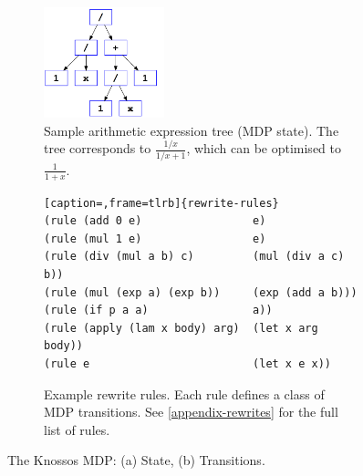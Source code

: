 \documentclass[fullpage,twocolumn]{article} %
\begin{document}
\begin{figure}[t!]
    \centering
    \begin{subfigure}{0.4\textwidth}
        \centering
        \includegraphics[height=3.2cm]{sample-expression}
        \caption{Sample arithmetic expression tree (MDP state). The tree corresponds to $\frac{1/x}{1/x + 1}$, which can be optimised to $\frac{1}{1+x}$.}  
        \label{sample-state}
    \end{subfigure}
    \begin{subfigure}{0.59\textwidth}
    \begin{center}
    \begin{minipage}{0.99\textwidth}
\begin{lstlisting}[caption=,frame=tlrb]{rewrite-rules}
(rule (add 0 e)                 e)
(rule (mul 1 e)                 e)
(rule (div (mul a b) c)         (mul (div a c) b))
(rule (mul (exp a) (exp b))     (exp (add a b)))
(rule (if p a a)                a))
(rule (apply (lam x body) arg)  (let x arg body))
(rule e                         (let x e x))
        \end{lstlisting}
        \end{minipage}
        \end{center}
        \caption{Example rewrite rules. Each rule defines a class of MDP transitions. See \ref{appendix-rewrites} for the full list of rules.}
        \label{sample-rules}
    \end{subfigure}
    \caption{The Knossos MDP: (a) State, (b) Transitions.}
\end{figure}
\end{document}
